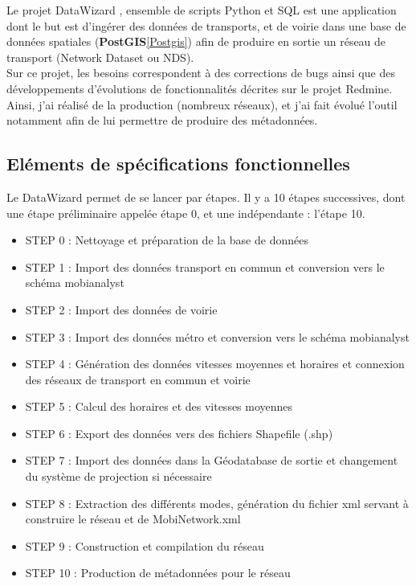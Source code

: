 \begin{itemize}
Le projet \og DataWizard \fg, ensemble de scripts Python et SQL est une application dont le but est d'ingérer des données de transports, et de voirie dans une base de données spatiales (\textbf{PostGIS}\ref{Postgis}) afin de produire en sortie un réseau de transport (Network Dataset ou NDS).\\
Sur ce projet, les besoins correspondent à des corrections de bugs ainsi que des développements d'évolutions de fonctionnalités décrites sur le projet Redmine. Ainsi, j'ai réalisé de la production (nombreux réseaux), et j'ai fait évolué l'outil notamment afin de lui permettre de produire des métadonnées.\\


\subsection{Eléments de spécifications fonctionnelles}

Le DataWizard permet de se lancer par étapes. Il y a 10 étapes successives, dont une étape préliminaire appelée étape 0, et une indépendante : l'étape 10.\\
\begin{itemize}
\item STEP 0 : Nettoyage et préparation de la base de données
\item STEP 1 : Import des données transport en commun et conversion vers le schéma mobianalyst
\item STEP 2 : Import des données de voirie
\item STEP 3 : Import des données métro et conversion vers le schéma mobianalyst
\item STEP 4 : Génération des données vitesses moyennes et horaires et connexion des réseaux de transport en commun et voirie
\item STEP 5 : Calcul des horaires et des vitesses moyennes
\item STEP 6 : Export des données vers des fichiers Shapefile (.shp)
\item STEP 7 : Import des données dans la Géodatabase de sortie et changement du système de projection si nécessaire
\item STEP 8 : Extraction des différents modes, génération du fichier xml servant à construire le réseau et de MobiNetwork.xml
\item STEP 9 : Construction et compilation du réseau
\item STEP 10 : Production de métadonnées pour le réseau
\end{itemize}


\end{itemize}
